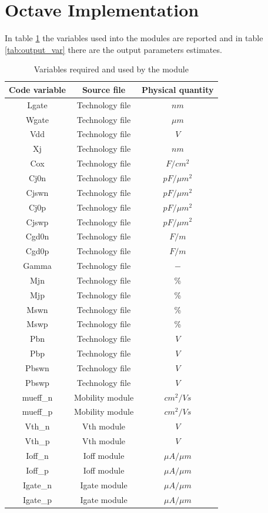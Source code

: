 \documentclass[12pt,  english, makeidx, a4paper, titlepage, oneside]{article}
\begin{document}
\section{Octave Implementation}
In table \ref{tab:input_dep} the variables  used  into the modules are reported and in table \ref{tab:output_var} there are the output parameters estimates.
\begin{table}[htbp]
	\begin{center}
		\begin{tabular}{|c|c|c|}
			\hline
			Code variable & Source file & Physical quantity\\
			\hline
			Lgate & Technology file & $nm$\\
			\hline
			Wgate & Technology file & $\mu m$\\
			\hline
			Vdd & Technology file & $V$\\
			\hline
			Xj & Technology file & $nm$\\
			\hline
			Cox & Technology file & $ F/ cm^2$\\
			\hline
			Cj0n & Technology file & $pF/\mu m^2$\\
			\hline
			Cjswn & Technology file & $pF/\mu m^2$\\
			\hline
			Cj0p & Technology file & $pF/\mu m^2$\\
			\hline
			Cjswp & Technology file & $pF/\mu m^2$\\
			\hline
			Cgd0n & Technology file & $F/m$\\
			\hline
			Cgd0p & Technology file & $F/m$\\
			\hline
			Gamma & Technology file & $-$\\
			\hline
			Mjn & Technology file & \% \\
			\hline
			Mjp & Technology file & \% \\
			\hline
			Mswn & Technology file & \% \\
			\hline
			Mswp & Technology file & \% \\
			\hline
			Pbn & Technology file & $V$ \\
			\hline
			Pbp & Technology file & $V$ \\
			\hline
			Pbswn & Technology file & $V$ \\
			\hline
			Pbswp & Technology file & $V$ \\
			\hline
			mueff\_n & Mobility module & $cm^2/Vs$\\
			\hline
			mueff\_p & Mobility module & $cm^2/Vs$\\
			\hline
			Vth\_n & Vth module & $V$\\
			\hline
			Vth\_p & Vth module & $V$\\
			\hline
			Ioff\_n & Ioff module & $\mu A/\mu m$\\
			\hline
			Ioff\_p & Ioff module & $\mu A/\mu m$\\
			\hline
			Igate\_n & Igate module & $\mu A/\mu m$\\
			\hline
			Igate\_p & Igate module & $\mu A/\mu m$\\
			\hline
		\end{tabular}
	\end{center}
	\caption{Variables required and used by the module}
	\label{tab:input_dep}
\end{table}
\end{document}
